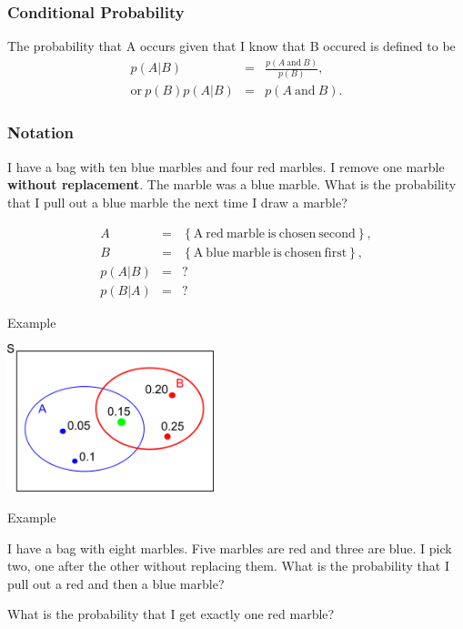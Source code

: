 \begin{frame}
  \frametitle{Conditional Probability}

  \begin{definition}
    The probability that A occurs given that I know that B occured is
    defined to be 
    \begin{eqnarray*}
      p(A|B) & = & \frac{p(A \mathrm{~and~} B)}{p(B)}, \\
      \mathrm{or~} 
      p(B) p(A|B)  &  =  & p(A \mathrm{~and~} B).
    \end{eqnarray*}
  \end{definition}

\end{frame}

\begin{frame}
  \frametitle{Notation}

  I have a bag with ten blue marbles and four red marbles. I remove
  one marble \textbf{without replacement}. The marble was a blue
  marble. What is the probability that I pull out a blue marble the
  next time I draw a marble?

  \vfill

  \begin{eqnarray*}
    A & = & \left\{ \mathrm{A~red~marble~is~chosen~second} \right\}, \\
    B & = & \left\{ \mathrm{A~blue~marble~is~chosen~first} \right\}, \\
    p(A|B) & = & ? \\
    p(B|A) & = & ?
  \end{eqnarray*}

  \vfill

\end{frame}


\begin{frame}{Example}

  \centerline{\includegraphics[width=6cm]{img/vennProbability}}
  
\end{frame}


\begin{frame}{Example}

  I have a bag with eight marbles. Five marbles are red and three are
  blue. I pick two, one after the other without replacing them. What
  is the probability that I pull out a red and then a blue marble?

  \vfill

  {

    What is the probability that I get exactly one red marble?
    \vfill

  }
  
\end{frame}


